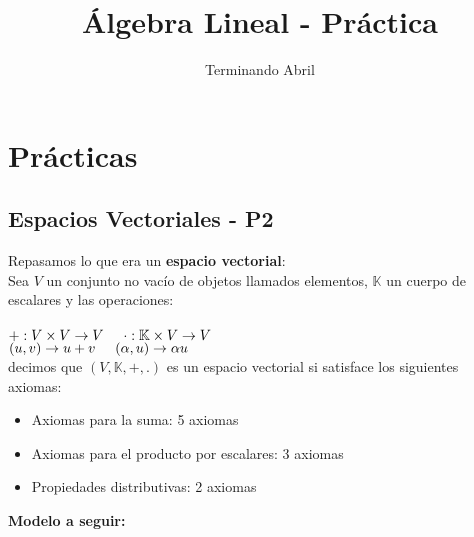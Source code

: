\documentclass{article}
\title{Álgebra Lineal - Práctica}
\date{Terminando Abril}
\begin{document}
\maketitle
\section{Prácticas}
\subsection{Espacios Vectoriales - P2}
Repasamos lo que era un \textbf{espacio vectorial}: \\
Sea $V$ un conjunto no vacío de objetos llamados elementos, $\mathbb{K}$ un cuerpo de escalares y las
operaciones: \\ \\
\hspace*{1cm} $+: V \times V \rightarrow V \hspace*{0.5cm} \cdot: \mathbb{K} \times V \rightarrow V$ \\
\hspace*{1.5cm} $(u,v) \rightarrow u+v \hspace*{0.5cm} (\alpha,u) \rightarrow \alpha u$ \\
decimos que $(V,\mathbb{K},+,.)$ es un espacio vectorial si satisface los siguientes axiomas: \\
\begin{itemize}
\item Axiomas para la suma: 5 axiomas
\item Axiomas para el producto por escalares: 3 axiomas
\item Propiedades distributivas: 2 axiomas
\end{itemize}
\textbf{Modelo a seguir:} 
\end{document}
